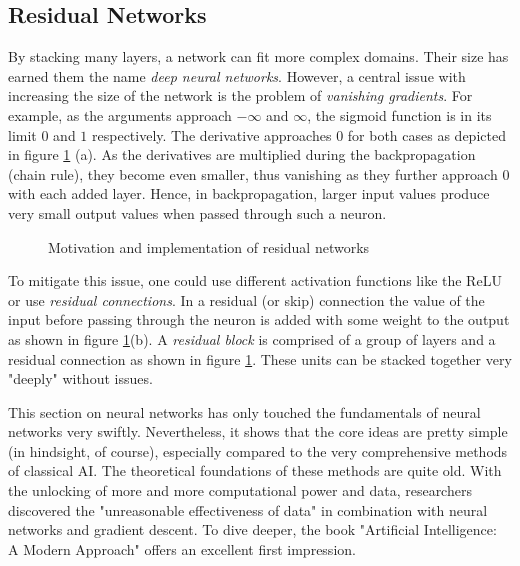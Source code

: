 \subsection{Residual Networks}
By stacking many layers, a network can fit more complex domains. Their size has earned them the name \textit{deep neural networks}. However, a central issue with increasing the size of the network is the problem of \textit{vanishing gradients}. For example, as the arguments approach $-\infty$ and $\infty$, the sigmoid function is in its limit $0$ and $1$ respectively. The derivative approaches $0$ for both cases as depicted in figure \ref{residual_network} (a). As the derivatives are multiplied during the backpropagation (chain rule), they become even smaller, thus vanishing as they further approach $0$ with each added layer. Hence, in backpropagation, larger input values produce very small output values when passed through such a neuron.

\begin{figure}[!h]
    \centering
    \caption{Motivation and implementation of residual networks}
    \label{residual_network}
\end{figure}

To mitigate this issue, one could use different activation functions like the ReLU or use \textit{residual connections}. In a residual (or skip) connection the value of the input before passing through the neuron is added with some weight to the output as shown in figure \ref{residual_network}(b). A \textit{residual block} is comprised of a group of layers and a residual connection as shown in figure \ref{residual_network}. These units can be stacked together very "deeply" without issues.

This section on neural networks has only touched the fundamentals of neural networks very swiftly. Nevertheless, it shows that the core ideas are pretty simple (in hindsight, of course), especially compared to the very comprehensive methods of classical AI. The theoretical foundations of these methods are quite old. With the unlocking of more and more computational power and data, researchers discovered the "unreasonable effectiveness of data" \cite{halevy_unreasonable_2009} in combination with neural networks and gradient descent. To dive deeper, the book "Artificial Intelligence: A Modern Approach" \cite{russell_artificial_2021} offers an excellent first impression.

